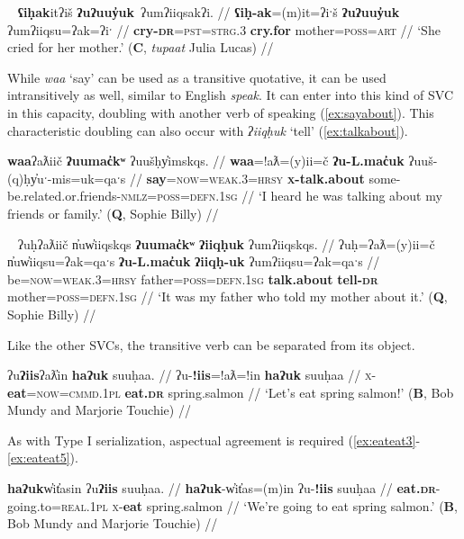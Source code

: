 \ex~ \label{ex:crycry}
\begingl
\glpreamble \textbf{ʕiḥak}itʔiš \textbf{ʔuʔuuy̓uk}\footnotemark\ ʔumʔiiqsakʔi. //
\gla \textbf{ʕiḥ-ak}=(m)it=ʔiˑš \textbf{ʔuʔuuy̓uk} ʔumʔiiqsu=ʔak=ʔiˑ //
\glb \textbf{cry-\textsc{dr}}=\textsc{pst}=\textsc{strg.3} \textbf{cry.for} mother=\textsc{poss}=\textsc{art} //
\glft `She cried for her mother.' (\textbf{C}, \textit{tupaat} Julia Lucas) //
\endgl
\xe


While \textit{waa} `say' can be used as a transitive quotative, it can be used intransitively as well, similar to English \textit{speak}. It can enter into this kind of SVC in this capacity, doubling with another verb of speaking (\ref{ex:sayabout}). This characteristic doubling can also occur with \textit{ʔiiqḥuk} `tell' (\ref{ex:talkabout}).

\ex \label{ex:sayabout}
\begingl
\glpreamble \textbf{waa}ʔaƛiič \textbf{ʔuumac̓kʷ} ʔuušḥy̓imskqs. //
\gla \textbf{waa}=!aƛ=(y)ii=č \textbf{ʔu-L.mac̓uk} ʔuuš-(q)ḥy̓uˑ-mis=uk=qaˑs //
\glb \textbf{say}=\textsc{now}=\textsc{weak.3}=\textsc{hrsy} \textbf{\textsc{x}-talk.about} some-be.related.or.friends-\textsc{nmlz}=\textsc{poss}=\textsc{defn.1sg} //
\glft `I heard he was talking about my friends or family.' (\textbf{Q}, Sophie Billy) //
\endgl
\xe

\ex~ \label{ex:talkabout}
\begingl
\glpreamble ʔuḥʔaƛiič n̓uw̓iiqskqs \textbf{ʔuumac̓kʷ} \textbf{ʔiiqḥuk} ʔumʔiiqskqs. //
\gla ʔuḥ=ʔaƛ=(y)ii=č n̓uw̓iiqsu=ʔak=qaˑs \textbf{ʔu-L.mac̓uk} \textbf{ʔiiqḥ-uk} ʔumʔiiqsu=ʔak=qaˑs //
\glb be=\textsc{now}=\textsc{weak.3}=\textsc{hrsy} father=\textsc{poss}=\textsc{defn.1sg} \textbf{talk.about} \textbf{tell-\textsc{dr}} mother=\textsc{poss}=\textsc{defn.1sg} //
\glft `It was my father who told my mother about it.' (\textbf{Q}, Sophie Billy) //
\endgl
\xe

Like the other SVCs, the transitive verb can be separated from its object.

\ex \label{ex:eateat2}
\begingl
\glpreamble ʔu\textbf{ʔiis}ʔaƛ̓in \textbf{haʔuk} suuḥaa. //
\gla ʔu-\textbf{!iis}=!aƛ=!in \textbf{haʔuk} suuḥaa //
\glb \textsc{x}-\textbf{eat}=\textsc{now}=\textsc{cmmd.1pl} \textbf{eat.\textsc{dr}} spring.salmon //
\glft `Let's eat spring salmon!' (\textbf{B}, Bob Mundy and Marjorie Touchie) //
\endgl
\xe

As with Type I serialization, aspectual agreement is required (\ref{ex:eateat3}-\ref{ex:eateat5}).

\ex \label{ex:eateat3}
\begingl
\glpreamble \textbf{haʔuk}w̓it̓asin ʔu\textbf{ʔiis} suuḥaa. //
\gla \textbf{haʔuk}-w̓it̓as=(m)in ʔu-\textbf{!iis} suuḥaa //
\glb \textbf{eat.\textsc{dr}}-going.to=\textsc{real.1pl} \textsc{x}-\textbf{eat} spring.salmon //
\glft `We're going to eat spring salmon.' (\textbf{B}, Bob Mundy and Marjorie Touchie) //
\endgl
\xe

